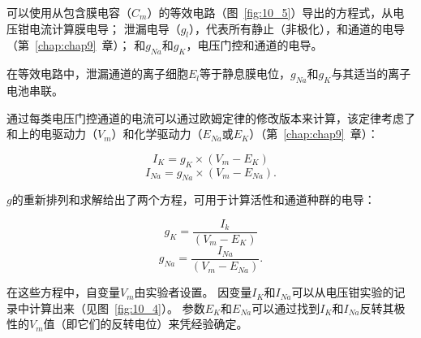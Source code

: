 \begin{proposition}[从电压钳数据计算膜电导] \label{box:10_2}
	
	\quad \quad 可以使用从包含膜电容（$C_m$）的等效电路（图~\ref{fig:10_5}）导出的方程式，从电压钳电流计算膜电导；
	泄漏电导（$g_l$），代表所有静止（非极化），和通道的电导（第~\ref{chap:chap9}~章）；
	和$g_{Na}$和$g_K$，电压门控和通道的电导。
	
	\quad \quad 在等效电路中，泄漏通道的离子细胞$E_l$等于静息膜电位，$g_{Na}$和$g_K$与其适当的离子电池串联。
	
	\quad \quad 通过每类电压门控通道的电流可以通过欧姆定律的修改版本来计算，该定律考虑了和上的电驱动力（$V_m$）和化学驱动力（$E_{Na}$或$E_K$）（第~\ref{chap:chap9}~章）：
	
	\begin{equation}
		I_K = g_K \times (V_m - E_K)
	\end{equation}
	\begin{equation}
		I_{Na} = g_{Na} \times (V_m - E_{Na}).
	\end{equation}
	
	\quad \quad $g$的重新排列和求解给出了两个方程，可用于计算活性和通道种群的电导：
	
	\begin{equation}
		g_K = \frac{I_k}{(V_m - E_K)}
	\end{equation}
	\begin{equation}
		g_{Na} = \frac{I_{Na}}{(V_m - E_{Na})}.
	\end{equation}
	
	\quad \quad 在这些方程中，自变量$V_m$由实验者设置。
	因变量$I_K$和$I_{Na}$可以从电压钳实验的记录中计算出来（见图~\ref{fig:10_4}）。
	参数$E_K$和$E_{Na}$可以通过找到$I_K$和$I_{Na}$反转其极性的$V_m$值（即它们的反转电位）来凭经验确定。
	
\end{proposition}


